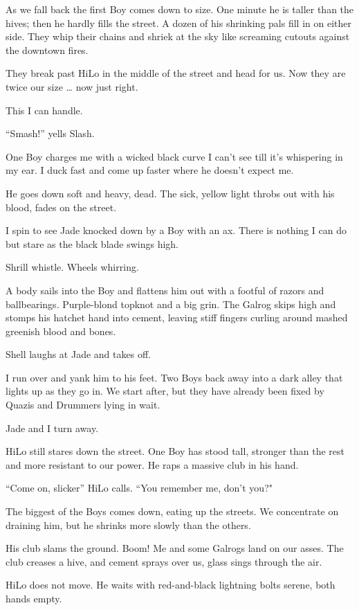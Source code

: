 As we fall back the first Boy comes down to size. One minute he is taller than the hives; then he hardly fills the street. A dozen of his shrinking pals fill in on either side. They whip their chains and shriek at the sky like screaming cutouts against the downtown fires.

They break past HiLo in the middle of the street and head for us. Now they are twice our size … now just right.

This I can handle.

“Smash!” yells Slash.

One Boy charges me with a wicked black curve I can't see till it's whispering in my ear. I duck fast and come up faster where he doesn't expect me.

He goes down soft and heavy, dead. The sick, yellow light throbs out with his blood, fades on the street.

I spin to see Jade knocked down by a Boy with an ax. There is nothing I can do but stare as the black blade swings high.

Shrill whistle. Wheels whirring.

A body sails into the Boy and flattens him out with a footful of razors and ballbearings. Purple-blond topknot and a big grin. The Galrog skips high and stomps his hatchet hand into cement, leaving stiff fingers curling around mashed greenish blood and bones.

Shell laughs at Jade and takes off.

I run over and yank him to his feet. Two Boys back away into a dark alley that lights up as they go in. We start after, but they have already been fixed by Quazis and Drummers lying in wait.

Jade and I turn away.

HiLo still stares down the street. One Boy has stood tall, stronger than the rest and more resistant to our power. He raps a massive club in his hand.

“Come on, slicker” HiLo calls. “You remember me, don't you?"

The biggest of the Boys comes down, eating up the streets. We concentrate on draining him, but he shrinks more slowly than the others.

His club slams the ground. Boom! Me and some Galrogs land on our asses. The club creases a hive, and cement sprays over us, glass sings through the air.

HiLo does not move. He waits with red-and-black lightning bolts serene, both hands empty.

